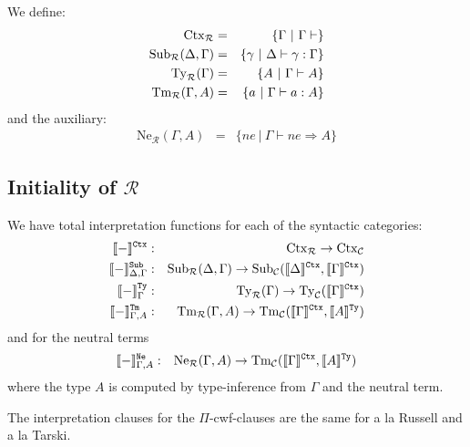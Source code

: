 \documentclass{lmcs}
\def\RawNe{\texttt{Ne}}
\def\Ctx{\mathrm{Ctx}}
\def\Ty{\mathrm{Ty}}
\def\Tm{\mathrm{Tm}}
\def\Ne{\mathrm{Ne}}
\def\R{\mathcal{R}}
\newcommand{\intCtxU}[1]{\llbracket #1 \rrbracket^\RawCtx}
\newcommand{\intSubU}[1]{\llbracket #1 \rrbracket^\RawSub}
\newcommand{\intTyU}[1]{\llbracket #1 \rrbracket^\RawTy}
\newcommand{\intTmU}[1]{\llbracket #1 \rrbracket^\RawTm}
\newcommand{\intNeU}[1]{\llbracket #1 \rrbracket^\RawNe}
\begin{document}
We define:
\begin{eqnarray*}
\Ctx_\R &=& \{ \Gamma \ |\ \Gamma \vdash \}\\
\Sub_\R(\Delta,\Gamma) &=&  \{ \gamma \ |\ \Delta \vdash \gamma : \Gamma  \}\\
\Ty_\R(\Gamma) &=&  \{ A \ |\ \Gamma \vdash A  \}\\
\Tm_\R(\Gamma,A) &=&  \{ a \ |\ \Gamma \vdash a : A  \}
\end{eqnarray*}
and the auxiliary:
\begin{eqnarray*}
\Ne_\R(\Gamma,A) &=&  \{ ne \ |\ \Gamma \vdash ne \Rightarrow A  \}
\end{eqnarray*}
\subsection{Initiality of $ \R$}

We have total interpretation functions for each of the syntactic categories:
\begin{eqnarray*}
\intCtxU{-} &:& \Ctx_\R \to \Ctx_\C\\
\intSubU{-}_{\Delta,\Gamma}&:& 
\Sub_\R(\Delta, \Gamma)
\to
\Sub_\C(\intCtxU{\Delta}, \intCtxU{\Gamma})\\
\intTyU{-}_\Gamma&:& \Ty_\R(\Gamma) \to \Ty_\C(\intCtxU{\Gamma})\\
\intTmU{-}_{\Gamma,A} &:& \Tm_\R(\Gamma,A) \to
\Tm_\C (\intCtxU{\Gamma}, \intTyU{A})
\end{eqnarray*}
and for the neutral terms
\begin{eqnarray*}
\intNeU{-}_{\Gamma,A} &:& \Ne_\R(\Gamma,A) \to \Tm_\C (\intCtxU{\Gamma}, \intTyU{A})
\end{eqnarray*}
where the type $A$ is computed by type-inference from $\Gamma$ and the neutral term.

The interpretation clauses for the $\Pi$-cwf-clauses are the same for a la Russell and a la Tarski.
\end{document}
